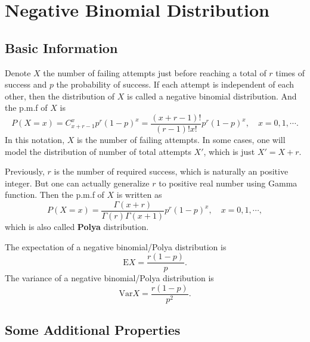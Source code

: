 \documentclass[a4paper,12pt]{article}
\begin{document}
\section{Negative Binomial Distribution}
\label{sec:negat-binom-distr}

\subsection{Basic Information}
\label{sec:basic-information-1}

Denote $X$ the number of failing attempts just before reaching a total of $r$ times of success and $p$ the probability of success. If each attempt is independent of each other, then the distribution of $X$ is called a negative binomial distribution. And the p.m.f of $X$ is
\[
  P\left(X = x\right)
  = C_{x + r - 1}^xp^r\left(1 - p\right)^x
  = \frac{\left(x + r - 1\right)!}{\left(r - 1\right)!x!}p^r\left(1 - p\right)^x
  ,\quad
  x = 0, 1, \cdots .
\]
In this notation, $X$ is the number of failing attempts. In some cases, one will model the distribution of number of total attempts $X'$, which is just $X' = X + r$. 

\par

Previously, $r$ is the number of required success, which is naturally an positive integer. But one can actually generalize $r$ to positive real number using Gamma function. Then the p.m.f of $X$ is written as
\[
  P\left(X = x\right) = \frac{\Gamma(x + r)}{\Gamma(r)\Gamma(x + 1)}p^r\left(1 - p\right)^x
  ,\quad
  x = 0, 1, \cdots
  ,
\]
which is also called \textbf{Polya} distribution.

\par

The expectation of a negative binomial/Polya distribution is
\[
  \mathrm{E}X = \frac{r\left(1 - p\right)}{p}
  .
\]
The variance of a negative binomial/Polya distribution is
\[
  \mathrm{Var}X = \frac{r\left(1 - p\right)}{p ^ 2}
  .
\]

\subsection{Some Additional Properties}
\label{sec:some-addit-prop-1}
\end{document}
